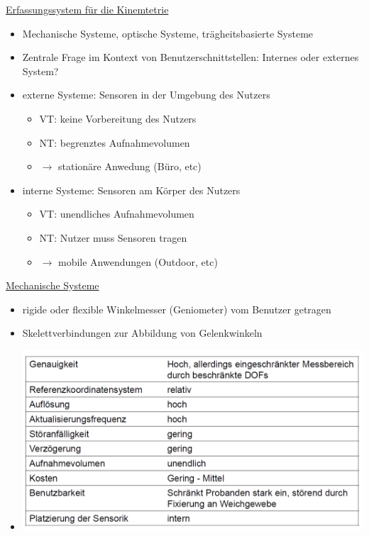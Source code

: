 \documentclass[a4paper,10pt,oneside]{article}
\begin{document}
\underline{Erfassungssystem für die Kinemtetrie} \\	
	\begin{itemize}
		\item Mechanische Systeme, optische Systeme, trägheitsbasierte Systeme
		\item Zentrale Frage im Kontext von Benutzerschnittstellen: Internes oder externes System?
		\item externe Systeme: Sensoren in der Umgebung des Nutzers
			\begin{itemize}
				\item VT: keine Vorbereitung des Nutzers
				\item NT: begrenztes Aufnahmevolumen
				\item $\rightarrow$ stationäre Anwedung (Büro, etc)
			\end{itemize}
		\item interne Systeme: Sensoren am Körper des Nutzers
			\begin{itemize}
				\item VT: unendliches Aufnahmevolumen
				\item NT: Nutzer muss Sensoren tragen
				\item $\rightarrow$ mobile Anwendungen (Outdoor, etc)
			\end{itemize}
	\end{itemize}
	
\underline{Mechanische Systeme} \\
	\begin{itemize}
		\item rigide oder flexible Winkelmesser (Geniometer) vom Benutzer getragen
		\item Skelettverbindungen zur Abbildung von Gelenkwinkeln
		\item[] \includegraphics[scale=0.2]{Grafiken/2226.png}
	\end{itemize}
\end{document}
